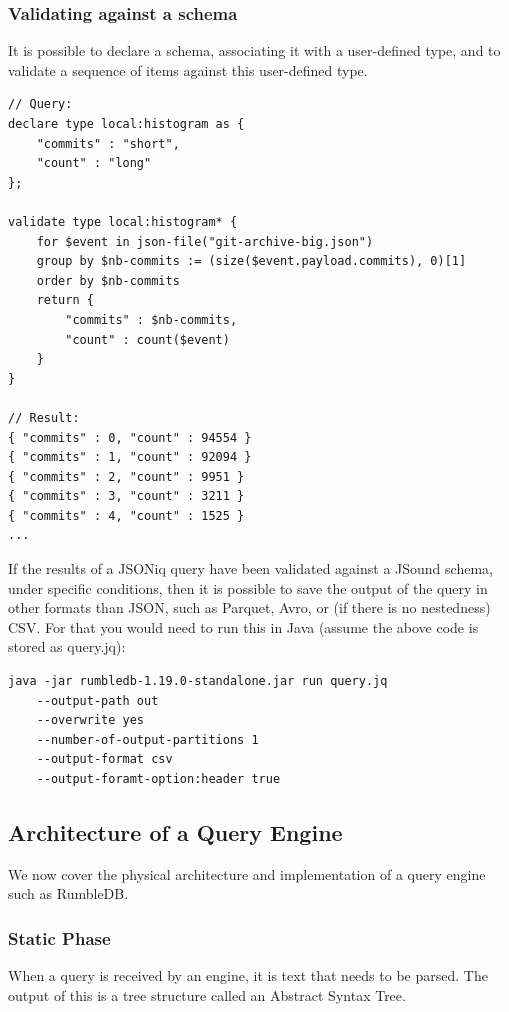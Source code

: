 \subsubsection{Validating against a schema}
It is possible to declare a schema, associating it with a user-defined type, and to validate a sequence of items against this user-defined type.

\begin{lstlisting}[style=json]
// Query:
declare type local:histogram as {
    "commits" : "short",
    "count" : "long"
};

validate type local:histogram* {
    for $event in json-file("git-archive-big.json")
    group by $nb-commits := (size($event.payload.commits), 0)[1]
    order by $nb-commits
    return {
        "commits" : $nb-commits,
        "count" : count($event)
    }
}

// Result:
{ "commits" : 0, "count" : 94554 }
{ "commits" : 1, "count" : 92094 }
{ "commits" : 2, "count" : 9951 }
{ "commits" : 3, "count" : 3211 }
{ "commits" : 4, "count" : 1525 }
...
\end{lstlisting}

If the results of a JSONiq query have been validated against a JSound schema, under specific conditions, then it is possible to save the output of the query in other formats than JSON, such as Parquet, Avro, or (if there is no nestedness) CSV. For that you would need to run this in Java (assume the above code is stored as query.jq):

\begin{lstlisting}[style=java]
java -jar rumbledb-1.19.0-standalone.jar run query.jq
    --output-path out
    --overwrite yes
    --number-of-output-partitions 1
    --output-format csv
    --output-foramt-option:header true
\end{lstlisting}

\subsection{Architecture of a Query Engine}
We now cover the physical architecture and implementation of a query engine such as RumbleDB.

\subsubsection{Static Phase}
When a query is received by an engine, it is text that needs to be parsed. The output of
this is a tree structure called an Abstract Syntax Tree.

